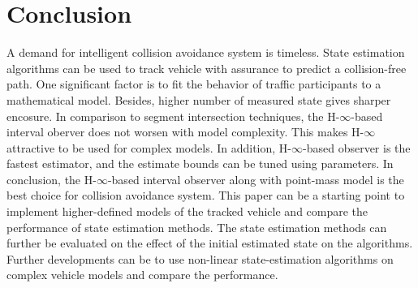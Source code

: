 \chapter{Conclusion} \label{ch:conclusion}
A demand for intelligent collision avoidance system is timeless. State estimation algorithms can be used to track vehicle with assurance to predict a collision-free path. One significant factor is to fit the behavior of traffic participants to a mathematical model. Besides, higher number of measured state gives sharper encosure. In comparison to segment intersection techniques, the H-$\infty$-based interval oberver does not worsen with model complexity. This makes H-$\infty$ attractive to be used for complex models. In addition, H-$\infty$-based observer is the fastest estimator, and the estimate bounds can be tuned using parameters. In conclusion, the H-$\infty$-based interval observer along with point-mass model is the best choice for collision avoidance system. This paper can be a starting point to implement higher-defined models of the tracked vehicle and compare the performance of state estimation methods. The state estimation methods can further be evaluated on the effect of the initial estimated state on the algorithms. Further developments can be to use non-linear state-estimation algorithms on complex vehicle models and compare the performance.